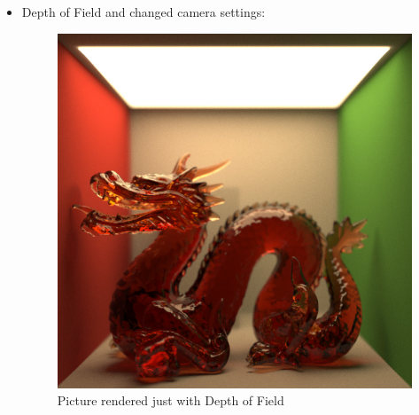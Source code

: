 \documentclass[11pt,a4paper]{article}
\begin{document}
\begin{itemize}
\item
Depth of Field and changed camera settings:\\
\begin{figure}[h]
\begin{center}
\includegraphics[scale=0.2]{images/dragon1024spp}
\caption[Picture showing Depth of Field]{Picture rendered just with Depth of Field}
\label{fig:3}
\end{center}
\end{figure}


\end{itemize}
\end{document}
